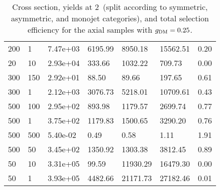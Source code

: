 \begin{table}
\begin{tabular}{lllllll}
200       &   1         &   7.47e+03  &   6195.99   &   8950.18   &   15562.51  &   0.20      \\ 
20        &   10        &   2.93e+04  &   333.66    &   1032.22   &   709.73    &   0.00      \\ 
300       &   150       &   2.92e+01  &   88.50     &   89.66     &   197.65    &   0.61      \\ 
300       &   1         &   2.12e+03  &   3076.73   &   5218.01   &   10709.61  &   0.43      \\ 
500       &   100       &   2.95e+02  &   893.98    &   1179.57   &   2699.74   &   0.77      \\ 
500       &   1         &   3.75e+02  &   1179.83   &   1500.65   &   3290.20   &   0.76      \\ 
500       &   500       &   5.40e-02  &   0.49      &   0.58      &   1.11      &   1.91      \\ 
500       &   50        &   3.45e+02  &   1350.92   &   1303.38   &   3812.45   &   0.89      \\ 
50        &   10        &   3.31e+05  &   99.59     &   11930.29  &   16479.30  &   0.00      \\ 
50        &   1         &   3.93e+05  &   4482.66   &   21171.73  &   27182.46  &   0.01      \\ 
\hline
\end{tabular}
\caption{Cross section, yields at 2~\ifb (split according to symmetric, asymmetric, and monojet categories), and total selection efficiency for the axial \DMj samples with $g_{\rm DM}=0.25$.}
\label{summaryTableAN_DMA_xs10_g0p25_2p1fb_exp.tex}
\end{table}
